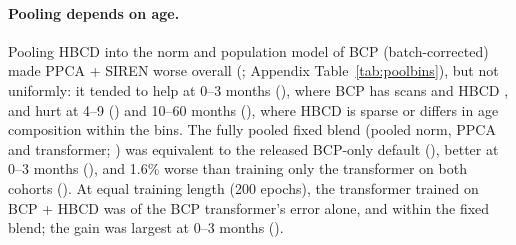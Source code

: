 \documentclass[11pt]{article}
\begin{document}
\begin{table}[t]
\centering\footnotesize
\caption{E3: HBCD alone (seeds 0--2, 20 scans per bin; transformer 200 epochs; shipped BCP weight table). Real mask:
all donors (donors in the tool's scope: Table~\ref{tab:real}).}\label{tab:e3}
\resizebox{\textwidth}{!}{}
\end{table}

\paragraph{Pooling depends on age.} Pooling HBCD into the norm and population model of BCP (batch-corrected) made PPCA +
SIREN worse overall (\pbAAll; Appendix Table~\ref{tab:poolbins}), but not uniformly: it tended to help at 0--3 months (\pbAA),
where BCP has \bcpbinA{} scans and HBCD \hbcdbinA, and hurt at 4--9 (\pbAB) and 10--60 months (\pbAC), where HBCD is
sparse or differs in age composition within the bins. The fully pooled fixed blend (pooled norm, PPCA and transformer;
\rPooledBlend) was equivalent to the released BCP-only default (\pbBAll), better at 0--3 months (\pbBA), and 1.6\% worse
than training only the transformer on both cohorts (\pbCAll). At equal training length (200 epochs), the transformer
trained on BCP + HBCD was \pbDAll{} of the BCP transformer's error alone, and \pbEAll{} within the fixed blend; the gain
was largest at 0--3 months (\pbDA). 
\end{document}
